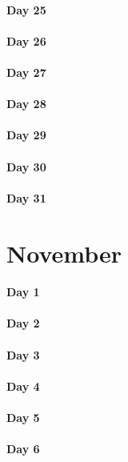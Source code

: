 \documentclass[UTF8,a4paper,8pt]{ctexart}
\begin{document}
 	 \paragraph{Day 25      \quad     }
 	 \paragraph{Day 26      \quad     }
 	 \paragraph{Day 27      \quad     }
 	 \paragraph{Day 28      \quad     }
 	 \paragraph{Day 29      \quad     }   
 	 \paragraph{Day 30      \quad     }
 	 \paragraph{Day 31      \quad     }
\section{November}
 	 \paragraph{Day 1       \quad     }
 	 \paragraph{Day 2       \quad     }
 	 \paragraph{Day 3       \quad     }
 	 \paragraph{Day 4       \quad     }
 	 \paragraph{Day 5       \quad     }
 	 \paragraph{Day 6       \quad     }
\end{document}
